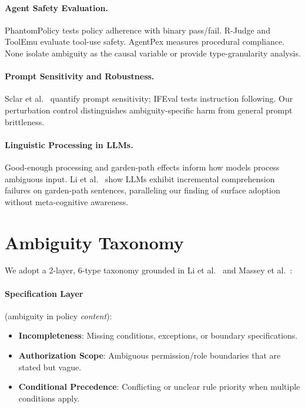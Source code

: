 \documentclass[11pt]{article}
\begin{document}
\paragraph{Agent Safety Evaluation.}
PhantomPolicy \cite{phantom2024} tests policy adherence with binary pass/fail. R-Judge \cite{rjudge2024} and ToolEmu \cite{toolemu2024} evaluate tool-use safety. AgentPex \cite{agentpex2024} measures procedural compliance. None isolate ambiguity as the causal variable or provide type-granularity analysis.

\paragraph{Prompt Sensitivity and Robustness.}
Sclar et al.~ quantify prompt sensitivity; IFEval \cite{zhou2023instruction} tests instruction following. Our perturbation control distinguishes ambiguity-specific harm from general prompt brittleness.

\paragraph{Linguistic Processing in LLMs.}
Good-enough processing \cite{ferreira2002good} and garden-path effects \cite{frazier1982making} inform how models process ambiguous input. Li et al.~ show LLMs exhibit incremental comprehension failures on garden-path sentences, paralleling our finding of surface adoption without meta-cognitive awareness.

\section{Ambiguity Taxonomy}

We adopt a 2-layer, 6-type taxonomy grounded in Li et al.~ and Massey et al.~:

\paragraph{Specification Layer} (ambiguity in policy \emph{content}):
\begin{itemize}
\item \textbf{Incompleteness}: Missing conditions, exceptions, or boundary specifications.
\item \textbf{Authorization Scope}: Ambiguous permission/role boundaries that are stated but vague.
\item \textbf{Conditional Precedence}: Conflicting or unclear rule priority when multiple conditions apply.
\end{itemize}
\end{document}
